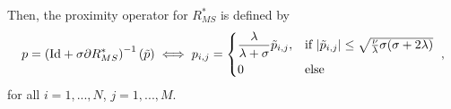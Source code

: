 \documentclass[abstracton]{scrreprt}
\begin{document}
            Then, the proximity operator for $R_{MS}^{\ast}$ is defined by
                \begin{equation}
                    p = \left( \textnormal{Id} + \sigma \partial R_{MS}^{\ast} \right)^{-1}(\tilde{p}) \iff p_{i,j} =
                        \begin{dcases*}
                            \frac{\lambda}{\lambda + \sigma} \tilde{p}_{i,j}, & \textnormal{if $|\tilde{p}_{i,j}| \le \sqrt{\frac{\nu}{\lambda}\sigma(\sigma + 2\lambda)}$} \\
                            0 & \textnormal{else}
                        \end{dcases*},
                    \label{eq:proximity_operator_r_star}
                \end{equation}
            for all $i = 1, ..., N$, $j = 1, ..., M$.
\end{document}
